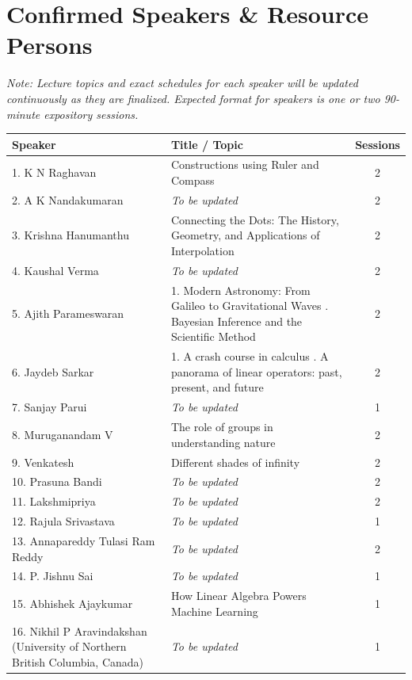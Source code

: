 \documentclass[11pt,a4paper]{article}
\begin{document}
\vspace{1.5em}

\section*{Confirmed Speakers \& Resource Persons}
\textit{Note: Lecture topics and exact schedules for each speaker will be updated continuously as they are finalized. Expected format for speakers is one or two 90-minute expository sessions.}

\vspace{0.5em}

\begin{tabularx}{\textwidth}{@{}l X c@{}}
\toprule
\textbf{Speaker} & \textbf{Title / Topic} & \textbf{Sessions} \\
\midrule
1. K N Raghavan & Constructions using Ruler and Compass & 2 \\
2. A K Nandakumaran & \textit{To be updated} & 2 \\
3. Krishna Hanumanthu & Connecting the Dots: The History, Geometry, and Applications of Interpolation & 2 \\
4. Kaushal Verma & \textit{To be updated} & 2 \\
5. Ajith Parameswaran & 1. Modern Astronomy: From Galileo to Gravitational Waves \newline 2. Bayesian Inference and the Scientific Method & 2 \\
6. Jaydeb Sarkar & 1. A crash course in calculus \newline 2. A panorama of linear operators: past, present, and future & 2 \\
7. Sanjay Parui & \textit{To be updated} & 1 \\
8. Muruganandam V & The role of groups in understanding nature & 2 \\
9. Venkatesh & Different shades of infinity & 2 \\
10. Prasuna Bandi & \textit{To be updated} & 2 \\
11. Lakshmipriya & \textit{To be updated} & 2 \\
12. Rajula Srivastava & \textit{To be updated} & 1 \\
13. Annapareddy Tulasi Ram Reddy & \textit{To be updated} & 2 \\
14. P. Jishnu Sai & \textit{To be updated} & 1 \\
15. Abhishek Ajaykumar & How Linear Algebra Powers Machine Learning & 1 \\
16. Nikhil P Aravindakshan (University of Northern British Columbia, Canada) & \textit{To be updated} & 1 \\

\end{tabularx}
\end{document}
